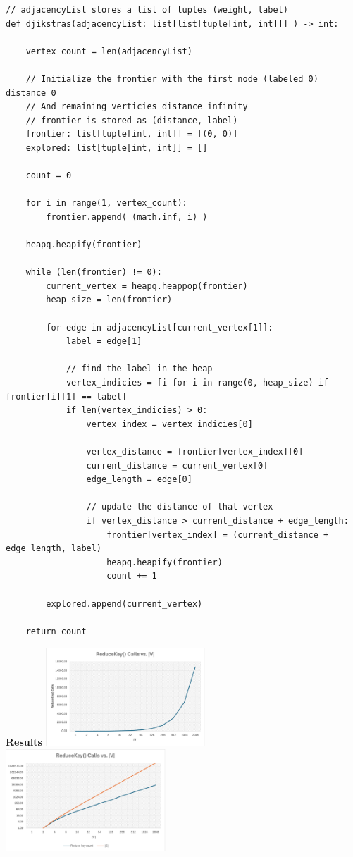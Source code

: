 \documentclass[12pt, letterpaper]{article}
\begin{document}
\begin{enumerate}
\begin{lstlisting}
// adjacencyList stores a list of tuples (weight, label)
def djikstras(adjacencyList: list[list[tuple[int, int]]] ) -> int:

    vertex_count = len(adjacencyList)

    // Initialize the frontier with the first node (labeled 0) distance 0
    // And remaining verticies distance infinity
    // frontier is stored as (distance, label)
    frontier: list[tuple[int, int]] = [(0, 0)]
    explored: list[tuple[int, int]] = []

    count = 0

    for i in range(1, vertex_count):
        frontier.append( (math.inf, i) )

    heapq.heapify(frontier)

    while (len(frontier) != 0):
        current_vertex = heapq.heappop(frontier)
        heap_size = len(frontier)

        for edge in adjacencyList[current_vertex[1]]:
            label = edge[1]

            // find the label in the heap
            vertex_indicies = [i for i in range(0, heap_size) if frontier[i][1] == label]
            if len(vertex_indicies) > 0:
                vertex_index = vertex_indicies[0]

                vertex_distance = frontier[vertex_index][0]
                current_distance = current_vertex[0]
                edge_length = edge[0]

                // update the distance of that vertex
                if vertex_distance > current_distance + edge_length:
                    frontier[vertex_index] = (current_distance + edge_length, label)
                    heapq.heapify(frontier)
                    count += 1
    
        explored.append(current_vertex)
    
    return count
\end{lstlisting}


\textbf{ Results } \newline
\includegraphics[width=0.45\textwidth]{src/graph1.png}
\includegraphics[width=0.45\textwidth]{src/graph2.png}


\end{enumerate}
\end{document}

